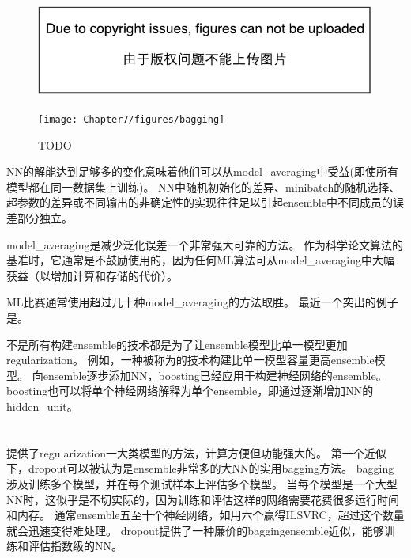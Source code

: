 \begin{figure}[!htb]
\ifOpenSource
\centerline{\includegraphics{figure.pdf}}
\else
\centerline{\texttt{[image: Chapter7/figures/bagging]}}
\fi
\caption{TODO}
\label{fig:chap7_bagging}
\end{figure}

\gls{NN}的解能达到足够多的变化意味着他们可以从\gls{model_averaging}中受益(即使所有模型都在同一数据集上训练)。
\gls{NN}中随机初始化的差异、\gls{minibatch}的随机选择、超参数的差异或不同输出的非确定性的实现往往足以引起\gls{ensemble}中不同成员的误差部分独立。


\gls{model_averaging}是减少泛化误差一个非常强大可靠的方法。
作为科学论文算法的基准时，它通常是不鼓励使用的，因为任何\gls{ML}算法可从\gls{model_averaging}中大幅获益（以增加计算和存储的代价）。

\gls{ML}比赛通常使用超过几十种\gls{model_averaging}的方法取胜。
最近一个突出的例子是\citep{Koren09}。

不是所有构建\gls{ensemble}的技术都是为了让\gls{ensemble}模型比单一模型更加\gls{regularization}。
例如，一种被称为的技术\citep{ConfLT:Freund:gametheorie,ConfML:Freund:AdaBoostCompar}构建比单一模型容量更高\gls{ensemble}模型。
向\gls{ensemble}逐步添加\gls{NN}，\gls{boosting}已经应用于构建神经网络的\gls{ensemble}\citep{Schwenk-nips10}。
\gls{boosting}也可以将单个神经网络解释为单个\gls{ensemble}，即通过逐渐增加\gls{NN}的\gls{hidden_unit}。

\section{}
\label{sec:dropout}
\citep{Srivastava14}提供了\gls{regularization}一大类模型的方法，计算方便但功能强大的。
第一个近似下，\gls{dropout}可以被认为是\gls{ensemble}非常多的大\gls{NN}的实用\gls{bagging}方法。
\gls{bagging}涉及训练多个模型，并在每个测试样本上评估多个模型。
当每个模型是一个大型\gls{NN}时，这似乎是不切实际的，因为训练和评估这样的网络需要花费很多运行时间和内存。
通常\gls{ensemble}五至十个神经网络，如\cite{Szegedy-et-al-arxiv2014}用六个赢得ILSVRC，超过这个数量就会迅速变得难处理。
\gls{dropout}提供了一种廉价的\gls{bagging}\gls{ensemble}近似，能够训练和评估指数级的\gls{NN}。

